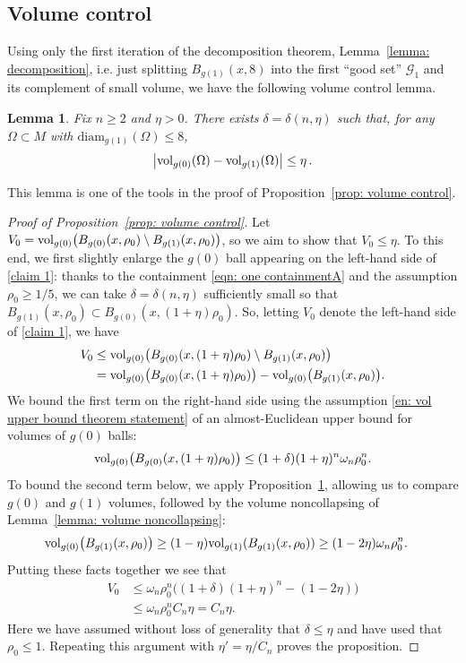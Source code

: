\documentclass[11pt,reqno]{amsart}
\newtheorem{lemma}[theorem]{Lemma}
\theoremstyle{remark}
\theoremstyle{definition}
\numberwithin{equation}{section}
\newcommand{\vol}{{\rm{vol}}}
\begin{document}
\subsection{Volume control}\label{s3.2}
Using only the first iteration of the decomposition theorem, Lemma~\ref{lemma: decomposition}, i.e. just splitting $B_{g(1)}(x, 8)$ into the first ``good set'' $\mathcal{G}_1$ and its complement of small volume, we have the following volume control lemma.
 \begin{lemma}
 	\label{prop: volumes} 
 Fix $n\geq 2$ and  $\eta>0$.  There exists $\delta = \delta(n, \eta)$ such that, for any $\Omega\subset M$ with $\text{diam}_{g(1)}(\Omega) \leq 8$,  
	 \[
	 \left|  \vol_{g(0)}(\Omega) -  \vol_{g(1)} (\Omega )\right|  \leq \eta \,.
	 \]
 \end{lemma}
This lemma is one of the tools in the proof of Proposition~\ref{prop: volume control}. 
\begin{proof}[Proof of Proposition~\ref{prop: volume control}]
Let $V_0 = 
\vol_{g(0)} \big(B_{g(0)}(x, \rho_0) \setminus B_{g(1)}(x, \rho_0)\big)$, so we aim to show that $V_0   \leq\eta.$
 To this end, 
	we first  slightly enlarge the $g(0)$ ball appearing on the left-hand side of \eqref{claim 1}:  thanks to the containment  \eqref{eqn: one containmentA} and the assumption $\rho_0\geq 1/5$, we can take $\delta=\delta(n,\eta)$ sufficiently small so that $ B_{g(1)}(x, \rho_0) \subset B_{g(0)}(x, (1+\eta)\rho_0)$. So, letting $V_0 $ denote the left-hand side of \eqref{claim 1},  we have 
\[
\begin{aligned}
V_0 & \leq\vol_{g(0)} \big(B_{g(0)}(x, (1+\eta) \rho_0) \setminus B_{g(1)}(x, \rho_0)\big)  \\
& = \vol_{g(0)}\big(B_{g(0)}(x, (1+\eta)\rho_0)\big)-\vol_{g(0)}\big(B_{g(1)}(x, \rho_0)\big).
\end{aligned}
\]
We bound the first term on the right-hand side using the assumption \eqref{en: vol upper bound theorem statement} of an almost-Euclidean upper bound for volumes of $g(0)$ balls:
\[
 \vol_{g(0)}\big(B_{g(0)}(x, (1+\eta)\rho_0)\big ) \leq (1+\delta)(1+\eta)^n \omega_n\rho_0^n.
 \]
To bound the second term below, we apply Proposition~\ref{prop: volumes}, allowing us to compare $g(0)$ and $g(1)$ volumes, followed by the volume noncollapsing of Lemma~\ref{lemma: volume noncollapsing}:
\[
\begin{aligned}
\vol_{g(0)}\big(B_{g(1)}(x, \rho_0)\big)
& \geq (1-\eta ) \vol_{g(1)}(B_{g(1)}(x, \rho_0)) \geq  (1-2 \eta) \omega_n\rho_0^n.
\end{aligned}
\]
Putting these facts together we see that 
\begin{align*}	
V_0 &  \leq \omega_n \rho_0^n \big((1+ \delta) (1+\eta)^n - (1-2 \eta) \big)  \\
& \leq  \omega_n \rho_0^n C_n \eta  = C_n\eta. 
\end{align*}
Here we have assumed without loss of generality that $\delta\leq \eta$ and have used that $\rho_0\leq 1.$ Repeating this argument with $\eta' =\eta/C_n $  proves the proposition.
\end{proof}
%
%
\end{document}

